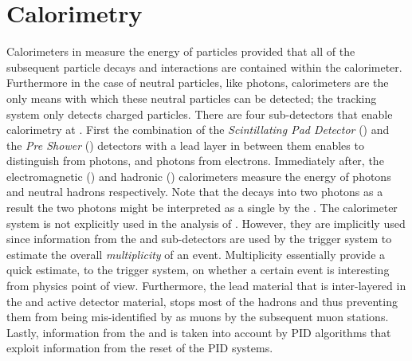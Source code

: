 

\section{Calorimetry}
\label{det_calo}
Calorimeters in \lhcb measure the energy of particles provided that all of the subsequent particle decays
and interactions are contained within the calorimeter. Furthermore in the case of neutral particles, like photons,
calorimeters are the only means with which these neutral particles can be detected; the tracking system
only detects charged particles. There are four sub-detectors that enable calorimetry at \lhcb.
First the combination of the {\it Scintillating Pad Detector} (\spd)
and the {\it Pre Shower} (\presh) detectors with a lead layer in between them enables to distinguish \piz from
photons, and photons from electrons. Immediately after, the electromagnetic (\ecal) and hadronic (\hcal)
calorimeters measure the energy of photons and neutral hadrons respectively.
Note that the \piz decays into two photons as a result the two photons might be interpreted as a single by the \ecal.
The calorimeter system is not explicitly used in the analysis of .
However, they are implicitly used since information from the \spd and \presh sub-detectors are used
by the \lzero trigger system to estimate the overall {\it multiplicity} of an event. Multiplicity essentially
provide a quick estimate, to the \lzero trigger system, on whether a certain event is interesting from physics
point of view. Furthermore, the lead material that is inter-layered in the \ecal and \hcal active detector material,
stops most of the hadrons and thus preventing them from being mis-identified by as muons by the subsequent muon stations.
Lastly, information from the \ecal and \hcal is taken into account by PID algorithms that exploit information from
the reset of the PID systems.

